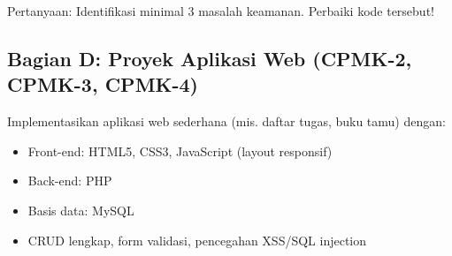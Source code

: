 Pertanyaan: Identifikasi minimal 3 masalah keamanan. Perbaiki kode tersebut!

\subsection{Bagian D: Proyek Aplikasi Web (CPMK-2, CPMK-3, CPMK-4)}

Implementasikan aplikasi web sederhana (mis. daftar tugas, buku tamu) dengan:
\begin{itemize}
  \item Front-end: HTML5, CSS3, JavaScript (layout responsif)
  \item Back-end: PHP
  \item Basis data: MySQL
  \item CRUD lengkap, form validasi, pencegahan XSS/SQL injection
\end{itemize}
